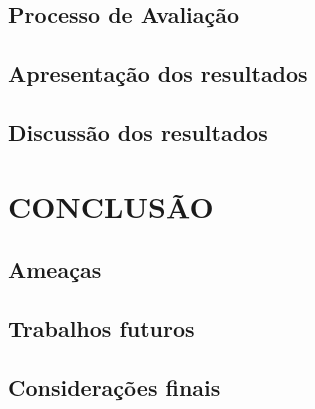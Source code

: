 \documentclass[12pt,openany,oneside,a4paper,english,brazil]{abntbibufjf}
\begin{document}
  \section{Processo de Avaliação}

  \section{Apresentação dos resultados}\label{section:apresentacao}

  \section{Discussão dos resultados}\label{section:discussao}

\chapter{CONCLUSÃO}\label{chap:conclusao}

  \section{Ameaças}\label{section:ameacas}

  \section{Trabalhos futuros}\label{section:trabalhos_futuros}

  \section{Considerações finais}\label{section:consideracoes_finais}






\postextual








\end{document}
